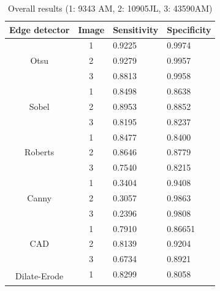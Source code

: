 \documentclass{article}
\begin{document}
\begin{table}[H]
\centering
\caption{Overall results (1: 9343 AM, 2: 10905JL, 3: 43590AM)}
\label{my-label}
\begin{tabular}{|c|c|l|l|}
\hline
\multicolumn{1}{|l|}{Edge detector} & \multicolumn{1}{l|}{Image} & Sensitivity & Specificity \\ \hline
\multirow{3}{*}{Otsu}               & 1                          & 0.9225      & 0.9974      \\ \cline{2-4} 
                                    & 2                          & 0.9279      & 0.9957      \\ \cline{2-4} 
                                    & 3                          & 0.8813      & 0.9958      \\ \hline
\multirow{3}{*}{Sobel}              & 1                          & 0.8498      & 0.8638      \\ \cline{2-4} 
                                    & 2                          & 0.8953      & 0.8852      \\ \cline{2-4} 
                                    & 3                          & 0.8195      & 0.8237      \\ \hline
\multirow{3}{*}{Roberts}            & 1                          & 0.8477      & 0.8400      \\ \cline{2-4} 
                                    & 2                          & 0.8646      & 0.8779      \\ \cline{2-4} 
                                    & 3                          & 0.7540      & 0.8215      \\ \hline
\multirow{3}{*}{Canny}              & 1                          & 0.3404      & 0.9408      \\ \cline{2-4} 
                                    & 2                          & 0.3057      & 0.9863      \\ \cline{2-4} 
                                    & 3                          & 0.2396      & 0.9808      \\ \hline
\multirow{3}{*}{CAD}                & 1                          & 0.7910      & 0.86651     \\ \cline{2-4} 
                                    & 2                          & 0.8139      & 0.9204      \\ \cline{2-4} 
                                    & 3                          & 0.6734      & 0.8921      \\ \hline
\multirow{3}{*}{Dilate-Erode}       & 1                          & 0.8299      & 0.8058      \\ \cline{2-4} 

\end{tabular}
\end{table}
\end{document}
